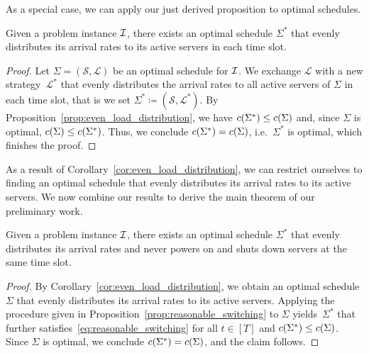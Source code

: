 As a special case, we can apply our just derived proposition to optimal schedules.
\begin{cor}\label{cor:even_load_distribution}
Given a problem instance $\mathcal{I}$, there exists an optimal schedule $\Sigma^*$ that evenly distributes its arrival rates to its active servers in each time slot.
\end{cor}
\begin{proof}
Let $\Sigma=(\mathcal{S},\mathcal{L})$ be an optimal schedule for $\mathcal{I}$. We exchange $\mathcal{L}$ with a new strategy~$\mathcal{L}^*$ that evenly distributes the arrival rates to all active servers of $\Sigma$ in each time slot, that is we set $\Sigma^*\coloneqq(\mathcal{S},\mathcal{L}^*)$. By Proposition~\ref{prop:even_load_distribution}, we have $c(\Sigma^*)\le c(\Sigma)$ and, since $\Sigma$ is optimal, $c(\Sigma)\le c(\Sigma^*)$. Thus, we conclude $c(\Sigma^*)=c(\Sigma)$, i.e.\ $\Sigma^*$ is optimal, which finishes the proof.
\end{proof}
As a result of Corollary~\ref{cor:even_load_distribution}, we can restrict ourselves to finding an optimal schedule that evenly distributes its arrival rates to its active servers. We now combine our results to derive the main theorem of our preliminary work.
\begin{thm}\label{thm:even_load_distribution_reasonable_switching}
Given a problem instance $\mathcal{I}$, there exists an optimal schedule $\Sigma^*$ that evenly distributes its arrival rates and never powers on and shuts down servers at the same time slot.
\end{thm}
\begin{proof}
By Corollary~\ref{cor:even_load_distribution}, we obtain an optimal schedule $\Sigma$ that evenly distributes its arrival rates to its active servers. Applying the procedure given in Proposition~\ref{prop:reasonable_switching} to $\Sigma$ yields~$\Sigma^*$ that further satisfies~\eqref{eq:reasonable_switching} for all $t\in[T]$ and $c(\Sigma^*)\le c(\Sigma)$. Since $\Sigma$ is optimal, we conclude $c(\Sigma^*)=c(\Sigma)$, and the claim follows.
\end{proof}

